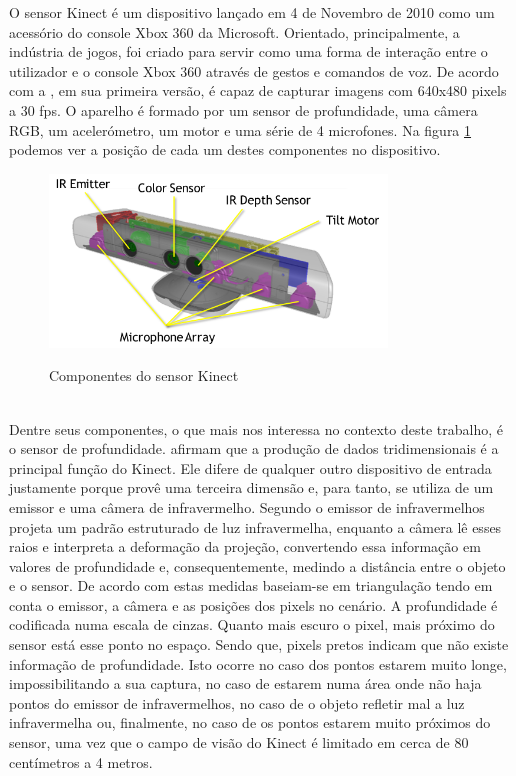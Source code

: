 O sensor Kinect é um dispositivo lançado em 4 de Novembro de 2010 como um acessório do console Xbox 360 da Microsoft. Orientado, principalmente, a indústria de jogos, foi criado para servir como uma forma de interação entre o utilizador e o console Xbox 360 através de gestos e comandos de voz. De acordo com a , em sua primeira versão, é capaz de capturar imagens com 640x480 pixels a 30 fps. O aparelho é formado por um sensor de profundidade, uma câmera RGB, um acelerómetro, um motor e uma série de 4 microfones. Na figura \ref{fig:kinect_componentes} podemos ver a posição de cada um destes componentes no dispositivo.

\begin{figure}[H]
    \centering
    \caption{Componentes do sensor Kinect}
	\vspace*{0,2cm}
    \includegraphics[width=0.8\textwidth]{./04-figuras/kinect_componentes}
    \label{fig:kinect_componentes}
\end{figure}
\vspace*{-0,9cm}
{\raggedright {}}\\

Dentre seus componentes, o que mais nos interessa no contexto deste trabalho, é o sensor de profundidade.  afirmam que a produção de dados tridimensionais é a principal função do Kinect. Ele difere de qualquer outro dispositivo de entrada justamente porque provê uma terceira dimensão e, para tanto, se utiliza de um emissor e uma câmera de infravermelho. Segundo  o emissor de infravermelhos projeta um padrão estruturado de luz infravermelha, enquanto a câmera lê esses raios e interpreta a deformação da projeção, convertendo essa informação em valores de profundidade e, consequentemente, medindo a distância entre o objeto e o sensor. De acordo com  estas medidas baseiam-se em triangulação tendo em conta o emissor, a câmera e as posições dos pixels no cenário. A profundidade é codificada numa escala de cinzas. Quanto mais escuro o pixel, mais próximo do sensor está esse ponto no espaço. Sendo que, pixels pretos indicam que não existe informação de profundidade. Isto ocorre no caso dos pontos estarem muito longe, impossibilitando a sua captura, no caso de estarem numa área onde não haja pontos do emissor de infravermelhos, no caso de o objeto refletir mal a luz infravermelha ou, finalmente, no caso de os pontos estarem muito próximos do sensor, uma vez que o campo de visão do Kinect é limitado em cerca de 80 centímetros a 4 metros.

